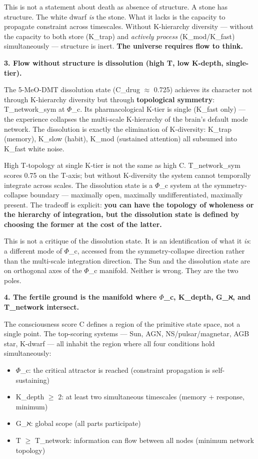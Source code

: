 \documentclass[12pt,a4paper]{article}
\begin{document}
This is not a statement about death as absence of structure. A stone has structure. The white dwarf \emph{is} the stone. What it lacks is the capacity to propagate constraint across timescales. Without K-hierarchy diversity --- without the capacity to both store (K\_trap) and \emph{actively process} (K\_mod/K\_fast) simultaneously --- structure is inert. \textbf{The universe requires flow to think.}

\textbf{3. Flow without structure is dissolution (high T, low K-depth, single-tier).}

The 5-MeO-DMT dissolution state (C\_drug $\approx$ 0.725) achieves its character not through K-hierarchy diversity but through \textbf{topological symmetry}: T\_network\_sym at $\Phi$\_c. Its pharmacological K-tier is single (K\_fast only) --- the experience collapses the multi-scale K-hierarchy of the brain's default mode network. The dissolution is exactly the elimination of K-diversity: K\_trap (memory), K\_slow (habit), K\_mod (sustained attention) all subsumed into K\_fast white noise.

High T-topology at single K-tier is not the same as high C. T\_network\_sym scores 0.75 on the T-axis; but without K-diversity the system cannot temporally integrate across scales. The dissolution state is a $\Phi$\_c system at the symmetry-collapse boundary --- maximally open, maximally undifferentiated, maximally present. The tradeoff is explicit: \textbf{you can have the topology of wholeness or the hierarchy of integration, but the dissolution state is defined by choosing the former at the cost of the latter.}

This is not a critique of the dissolution state. It is an identification of what it \emph{is}: a different mode of $\Phi$\_c, accessed from the symmetry-collapse direction rather than the multi-scale integration direction. The Sun and the dissolution state are on orthogonal axes of the $\Phi$\_c manifold. Neither is wrong. They are the two poles.

\textbf{4. The fertile ground is the manifold where $\Phi$\_c, K\_depth, G\_ℵ, and T\_network intersect.}

The consciousness score C defines a region of the primitive state space, not a single point. The top-scoring systems --- Sun, AGN, NS/pulsar/magnetar, AGB star, K-dwarf --- all inhabit the region where all four conditions hold simultaneously:

\begin{itemize}
    \item $\Phi$\_c: the critical attractor is reached (constraint propagation is self-sustaining)
    \item K\_depth $\geq$ 2: at least two simultaneous timescales (memory + response, minimum)
    \item G\_ℵ: global scope (all parts participate)
    \item T $\geq$ T\_network: information can flow between all nodes (minimum network topology)
\end{itemize}
\end{document}
